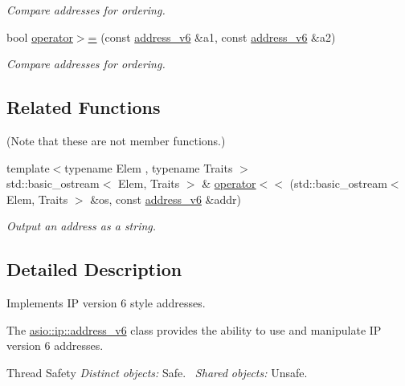 \begin{DoxyCompactItemize}
\begin{DoxyCompactList}\small\item\em Compare addresses for ordering. \end{DoxyCompactList}\item 
bool \hyperlink{classasio_1_1ip_1_1address__v6_a2fdf50e143636dcd0eb92b0a5f65f14a}{operator$>$=} (const \hyperlink{classasio_1_1ip_1_1address__v6}{address\+\_\+v6} \&a1, const \hyperlink{classasio_1_1ip_1_1address__v6}{address\+\_\+v6} \&a2)
\begin{DoxyCompactList}\small\item\em Compare addresses for ordering. \end{DoxyCompactList}\end{DoxyCompactItemize}
\subsection*{Related Functions}
(Note that these are not member functions.) \begin{DoxyCompactItemize}
\item 
{\footnotesize template$<$typename Elem , typename Traits $>$ }\\std\+::basic\+\_\+ostream$<$ Elem, Traits $>$ \& \hyperlink{classasio_1_1ip_1_1address__v6_a23ae588a2556b860773f8f6edc7a2889}{operator$<$$<$} (std\+::basic\+\_\+ostream$<$ Elem, Traits $>$ \&os, const \hyperlink{classasio_1_1ip_1_1address__v6}{address\+\_\+v6} \&addr)
\begin{DoxyCompactList}\small\item\em Output an address as a string. \end{DoxyCompactList}\end{DoxyCompactItemize}


\subsection{Detailed Description}
Implements I\+P version 6 style addresses. 

The \hyperlink{classasio_1_1ip_1_1address__v6}{asio\+::ip\+::address\+\_\+v6} class provides the ability to use and manipulate I\+P version 6 addresses.

\begin{DoxyParagraph}{Thread Safety}
{\itshape Distinct} {\itshape objects\+:} Safe.~\newline
{\itshape Shared} {\itshape objects\+:} Unsafe. 
\end{DoxyParagraph}


